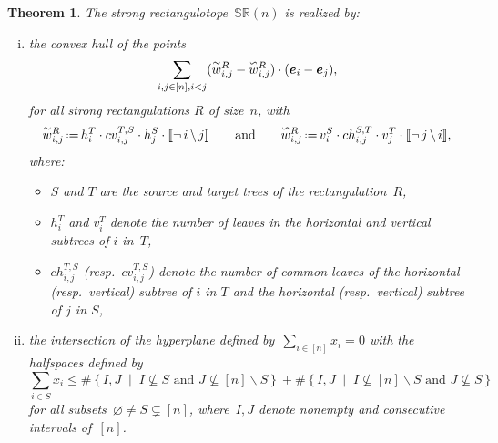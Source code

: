 \documentclass{amsart}
\newtheorem{theorem}{Theorem}%
\theoremstyle{definition}
\renewcommand{\b}[1]{{\boldsymbol{#1}}} %
\newcommand{\set}[2]{\left\{ #1 \;\middle|\; #2 \right\}} %
\newcommand{\ssm}{\smallsetminus} %
\newcommand{\eqdef}{\mbox{\,\raisebox{0.2ex}{\scriptsize\ensuremath{\mathrm:}}\ensuremath{=}\,}} %
\newcommand{\polytope}[1]{\mathds{#1}} %
\newcommand{\SRP}{\polytope{SR}} %
\newcommand{\yin}[1]{\smash{\overset{\sim}{#1}}}
\newcommand{\yang}[1]{\smash{\overset{\backsim}{#1}}}
\begin{document}
\begin{theorem}
\label{thm:strongRectangulotope}
The strong rectangulotope~$\SRP (n)$ is realized by:
  \begin{enumerate}[(i)]
  \item the convex hull of the points
  \[
  \sum_{i,j\in [n], i< j} (\yin{w}^R_{i,j} - \yang{w}^R_{i,j})\cdot (\b{e}_i - \b{e}_j),
  \]
   for all strong rectangulations $R$ of size~$n$, with
  \[
    \yin{w}^R_{i,j} \eqdef h^T_i \cdot cv^{T,S}_{i,j}\cdot h^S_ j\cdot \llbracket \neg \, i \, \backslash \, j \rrbracket
    \qquad\text{and}\qquad
    \yang{w}^R_{i,j} \eqdef v^S_i \cdot ch^{S,T}_{i,j}\cdot v^T_j \cdot \llbracket \neg \, j \, \backslash \, i \rrbracket,
  \]
 where:
  \begin{itemize}
  \item $S$ and $T$ are the source and target trees of the rectangulation~$R$,
  \item $h^T_i$ and $v^T_i$ denote the number of leaves in the horizontal and vertical subtrees of $i$ in~$T$,
  \item $ch^{T,S}_{i,j}$ (resp.~$cv^{T,S}_{i,j}$) denote the number of common leaves of the horizontal (resp.~vertical) subtree of $i$ in $T$ and the horizontal (resp.~vertical) subtree of $j$ in $S$,
  \end{itemize}
\item the intersection of the hyperplane defined by~$\sum_{i \in [n]} x_i = 0$ with the halfspaces defined by
  \[
  \sum_{i \in S} x_i \le \#\set{I,J}{I \not\subseteq S \text{ and } J \not\subseteq [n] \ssm S} + \#\set{I,J}{I \not\subseteq [n] \ssm S \text{ and } J \not\subseteq S}
  \]
  for all subsets~$\varnothing \ne S \subsetneq [n]$, where~$I,J$ denote nonempty and consecutive intervals of~$[n]$.
  \end{enumerate}
\end{theorem}

\end{document}
